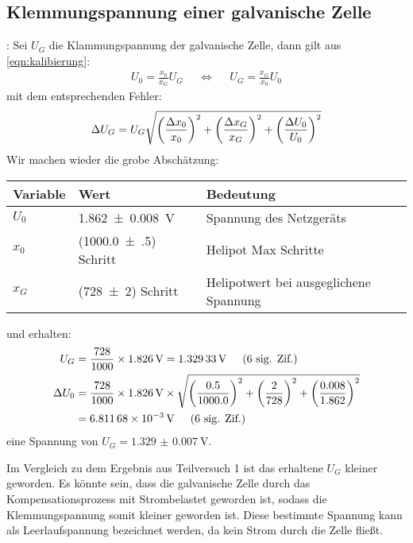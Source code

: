 	\subsection{Klemmungspannung einer galvanische Zelle}:
		Sei $U_G$ die Klammungspannung der galvanische Zelle, dann gilt aus \eqref{eqn:kalibierung}:
		\begin{align}
			U_0 = \frac{x_0}{x_G}U_G && \Leftrightarrow && U_G = \frac{x_G}{x_0}U_0
		\end{align}
		mit dem entsprechenden Fehler:
		\begin{align}
			\Delta U_G = U_G \relquad{x_0, x_G, U_0} 
		\end{align}
		Wir machen wieder die grobe Abschätzung:
		\begin{center}
			\begin{tabular}{lll}
				\toprule
				Variable & Wert & Bedeutung \\
				\midrule
				$U_0$ & \SI{1.862(8)}{\volt} & Spannung des Netzgeräts  \\
				$x_0$ & (\num{1000.0(5)}) Schritt & Helipot Max Schritte \\
				$x_G$ & (\num{728(2)}) Schritt & Helipotwert bei ausgeglichene Spannung  \\
				\bottomrule
			\end{tabular}
		\end{center}
		und erhalten:
		\begin{align}
			U_G &= \frac{\num{728}}{\num{1000}}\times\SI{1.826}{\volt} = \SI{1.32933}{\volt} \hspace{0.5cm}\text{(6 sig. Zif.)} \\
			\Delta U_0 &= \frac{\num{728}}{\num{1000}}\times\SI{1.826}{\volt}\times \sqrt{\left(\frac{0.5}{\num{1000.0}}\right)^2 + \left(\frac{2}{\num{728}}\right)^2 + \left(\frac{0.008}{\num{1.862}}\right)^2} \notag \\
			&= \SI{6.81168e-3}{\volt} \hspace{0.5cm}\text{(6 sig. Zif.)}
		\end{align}
		eine Spannung von $U_G = \SI{1.329(7)}{\volt}$. 

		Im Vergleich zu dem Ergebnis aus Teilversuch 1 ist das erhaltene $U_G$ kleiner geworden. Es könnte sein, dass die galvanische Zelle durch das Kompensationsprozess mit Strombelastet geworden ist, sodass die Klemmungspannung somit kleiner geworden ist. Diese bestimmte Spannung kann als Leerlaufspannung bezeichnet werden, da kein Strom durch die Zelle fließt. 